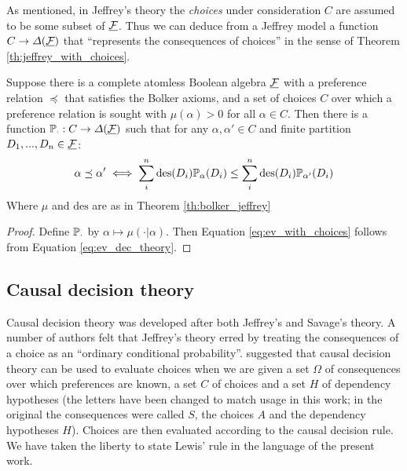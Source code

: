 As mentioned, in Jeffrey's theory the \emph{choices} under consideration $C$ are assumed to be some subset of $\underline{\mathcal{F}}$. Thus we can deduce from a Jeffrey model a function $C\to \Delta(\underline{\mathcal{F}})$ that ``represents the consequences of choices'' in the sense of Theorem \ref{th:jeffrey_with_choices}.

\begin{theorem}\label{th:jeffrey_with_choices}
Suppose there is a complete atomless Boolean algebra $\underline{\mathcal{F}}$ with a preference relation $\preceq$ that satisfies the Bolker axioms, and a set of choices $C$ over which a preference relation is sought with $\mu(\alpha)>0$ for all $\alpha\in C$. Then there is a function $\mathbb{P}_\cdot:C\to \Delta(\underline{\mathcal{F}})$ such that for any $\alpha,\alpha'\in C$ and finite partition $D_1,...,D_n\in \underline{\mathcal{F}}$:
\begin{align}
    \alpha \preceq \alpha'\iff \sum_{i}^n \text{des}(D_i) \mathbb{P}_\alpha(D_i) \leq \sum_{i}^n \text{des}(D_i) \mathbb{P}_{\alpha'}(D_i)\label{eq:ev_with_choices}
\end{align}
Where $\mu$ and $\mathrm{des}$ are as in Theorem \ref{th:bolker_jeffrey}
\end{theorem}

\begin{proof}
Define $\mathbb{P}_\cdot$ by $\alpha\mapsto \mu(\cdot|\alpha)$. Then Equation \ref{eq:ev_with_choices} follows from Equation \ref{eq:ev_dec_theory}.
\end{proof}

\subsection{Causal decision theory}

Causal decision theory was developed after both Jeffrey's and Savage's theory. A number of authors \citet{lewis_causal_1981,skyrms_causal_1982} felt that Jeffrey's theory erred by treating the consequences of a choice as an ``ordinary conditional probability''. \citet{lewis_causal_1981} suggested that causal decision theory can be used to evaluate choices when we are given a set $\Omega$ of consequences over which preferences are known, a set $C$ of choices and a set $H$ of dependency hypotheses (the letters have been changed to match usage in this work; in the original the consequences were called $S$, the choices $A$ and the dependency hypotheses $H$). Choices are then evaluated according to the causal decision rule. We have taken the liberty to state Lewis' rule in the language of the present work.

